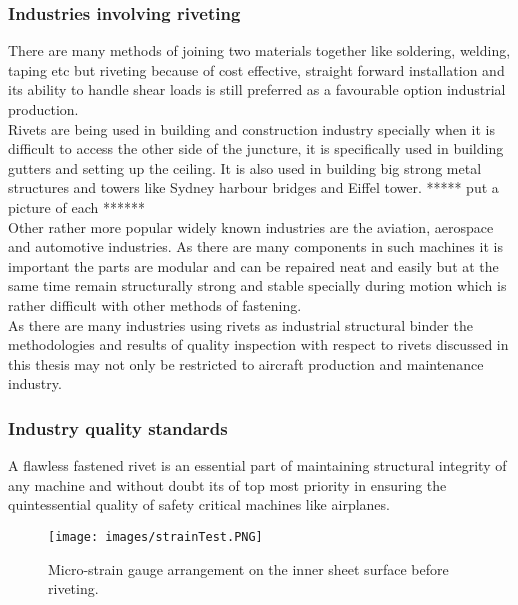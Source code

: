 \documentclass{article}
\begin{document}
\subsubsection{Industries involving riveting}

There are many methods of joining two materials together like soldering, welding, taping etc but riveting because of cost effective, straight forward installation and its ability to handle shear loads is still preferred as a favourable option industrial production. \\

Rivets are being used in building and construction industry specially when it is difficult to access the other side of the juncture, it is specifically used in building gutters and setting up the ceiling. It is also used in building big strong metal structures and towers like Sydney harbour bridges and Eiffel tower. ***** put a picture of each ******\\

Other rather more popular widely known industries are the aviation, aerospace and automotive industries. As there are many components in such machines it is important the parts are modular and can be repaired neat and easily but at the same time remain structurally strong and stable specially during motion which is rather difficult with other methods of fastening.\\

As there are many industries using rivets as industrial structural binder the methodologies and results of quality inspection with respect to rivets discussed in this thesis may not only be restricted to aircraft production and maintenance industry. 

\subsubsection{Industry quality standards}
    
    A flawless fastened rivet is an essential part of maintaining structural integrity of any machine and without doubt its of top most priority in ensuring the quintessential quality of safety critical machines like airplanes.
    \\
    \begin{figure}[htp]
    \centering
    \texttt{[image: images/strainTest.PNG]}
    \caption{ Micro-strain gauge arrangement on the inner sheet surface before riveting.  \cite{inbook}}
    \label{fig: strainGaugeTest}
\end{figure}
\end{document}
